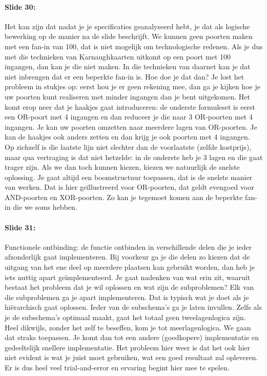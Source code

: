 \documentclass[10pt,a4paper]{book}
\begin{document}
\paragraph{Slide 30:} Het kan zijn dat nadat je je specificaties geanalyseerd hebt, je dat als logische bewerking op de manier na de slide beschrijft. We kunnen geen poorten maken met een fan-in van 100, dat is niet mogelijk om technologische redenen. Als je dus met die technieken van Karnaughkaarten uitkomt op een poort met 100 ingangen, dan kan je die niet maken. In die technieken van daarnet kan je dat niet inbrengen dat er een beperkte fan-in is. Hoe doe je dat dan? Je lost het probleem in stukjes op: eerst hou je er geen rekening mee, dan ga je kijken hoe je uw poorten kunt realiseren met minder ingangen dan je bent uitgekomen. Het komt erop neer dat je haakjes gaat introduceren: de onderste formuleset is eerst een OR-poort met 4 ingangen en dan reduceer je die naar 3 OR-poorten met 4 ingangen. Je kan uw poorten omzetten naar meerdere lagen van OR-poorten. Je kan de haakjes ook anders zetten en dan krijg je ook poorten met 4 ingangen.  \\
Op zichzelf is die laatste lijn niet slechter dan de voorlaatste (zelfde kostprijs), maar qua vertraging is dat niet hetzelde: in de onderste heb je 3 lagen en die gaat trager zijn. Als we dan toch kunnen kiezen, kiezen we natuurlijk de snelste oplossing. Je gaat altijd een boomstructuur toepassen, dat is de snelste manier van werken. Dat is hier ge\"illustreerd voor OR-poorten, dat geldt evengoed voor AND-poorten en XOR-poorten.  Zo kan je tegemoet komen aan de beperkte fan-in die we soms hebben.

\paragraph{Slide 31:} Functionele ontbinding: de functie ontbinden in verschillende delen die je ieder afzonderlijk gaat implementeren. Bij voorkeur ga je die delen zo kiezen dat de uitgang van het ene deel op meerdere plaatsen kan gebruikt worden, dan heb je iets nuttig apart ge\"implementeerd. Je gaat nadenken van wat erin zit, waaruit bestaat het probleem dat je wil oplossen en wat zijn de subproblemen? Elk van die subproblemen ga je apart implementeren. Dat is typisch wat je doet als je hi\"erarchisch gaat oplossen. Ieder van de subschema's ga je laten invullen. Zelfs als je de subschema's optimaal maakt, gaat het totaal geen tweelagenlogica zijn.\\
Heel dikwijls, zonder het zelf te beseffen, kom je tot meerlagenlogica. We gaan dat straks toepassen. Je komt dan tot een andere (goedkopere) implementatie en gedeeltelijk snellere implementatie. Het probleem hier weer is dat het ook hier niet evident is wat je juist moet gebruiken, wat een goed resultaat zal opleveren. Er is dus heel veel trial-and-error en ervaring begint hier mee te spelen. 
\end{document}
